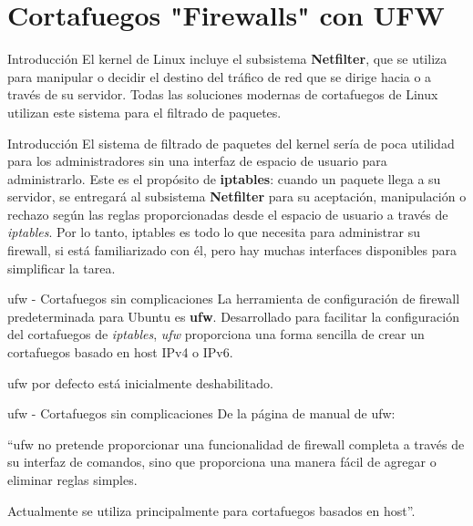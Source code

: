 
\section{Cortafuegos "Firewalls" con UFW}

\begin{frame}[c]{Introducción}
  El kernel de Linux incluye el subsistema \textbf{Netfilter}, que se
  utiliza para manipular o decidir el destino del tráfico de red que se
  dirige hacia o a través de su servidor. Todas las soluciones modernas
  de cortafuegos de Linux utilizan este sistema para el filtrado de paquetes.
\end{frame}

\begin{frame}[c]{Introducción}
  El sistema de filtrado de paquetes del kernel sería de poca utilidad para
  los administradores sin una interfaz de espacio de usuario para
  administrarlo. Este es el propósito de \textbf{iptables}: cuando un paquete
  llega a su servidor, se entregará al subsistema \textbf{Netfilter} para su
  aceptación, manipulación o rechazo según las reglas proporcionadas desde
  el espacio de usuario a través de \emph{iptables}. Por lo tanto, iptables
  es todo lo que necesita para administrar su firewall, si está familiarizado
  con él, pero hay muchas interfaces disponibles para simplificar la tarea.
\end{frame}

\begin{frame}[c]{ufw - Cortafuegos sin complicaciones}
  La herramienta de configuración de firewall predeterminada para Ubuntu es
  \textbf{ufw}. Desarrollado para facilitar la configuración del cortafuegos
  de \emph{iptables}, \emph{ufw} proporciona una forma sencilla de crear un
  cortafuegos basado en host IPv4 o IPv6.

  \vspace{\baselineskip}
  ufw por defecto está inicialmente deshabilitado.
\end{frame}

\begin{frame}[c]{ufw - Cortafuegos sin complicaciones}
  De la página de manual de ufw:

  \vspace{\baselineskip}
  “ufw no pretende proporcionar una funcionalidad de firewall completa a
  través de su interfaz de comandos, sino que proporciona una manera fácil
  de agregar o eliminar reglas simples.

  \vspace{\baselineskip}
  Actualmente se utiliza principalmente para cortafuegos basados en host”.
\end{frame}

